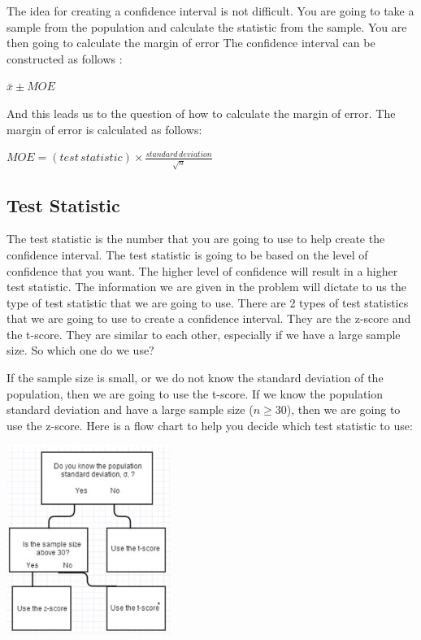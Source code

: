 \documentclass[
  letterpaper,
  DIV=11,
  numbers=noendperiod]{scrreprt}
\begin{document}
The idea for creating a confidence interval is not difficult. You are
going to take a sample from the population and calculate the statistic
from the sample. You are then going to calculate the margin of error The
confidence interval can be constructed as follows :

\(\bar{x} \pm MOE\)

And this leads us to the question of how to calculate the margin of
error. The margin of error is calculated as follows:

\(\displaystyle{MOE = (test\,statistic) \times \frac{standard\,deviation}{\sqrt{n}}}\)

\subsection*{Test Statistic}\label{test-statistic}

The test statistic is the number that you are going to use to help
create the confidence interval. The test statistic is going to be based
on the level of confidence that you want. The higher level of confidence
will result in a higher test statistic. The information we are given in
the problem will dictate to us the type of test statistic that we are
going to use. There are 2 types of test statistics that we are going to
use to create a confidence interval. They are the z-score and the
t-score. They are similar to each other, especially if we have a large
sample size. So which one do we use?

If the sample size is small, or we do not know the standard deviation of
the population, then we are going to use the t-score. If we know the
population standard deviation and have a large sample size
(\(n \geq 30\)), then we are going to use the z-score. Here is a flow
chart to help you decide which test statistic to use:

\includegraphics[width=0.4\textwidth,height=\textheight]{./images/EPCI_7.jpg}
\end{document}
